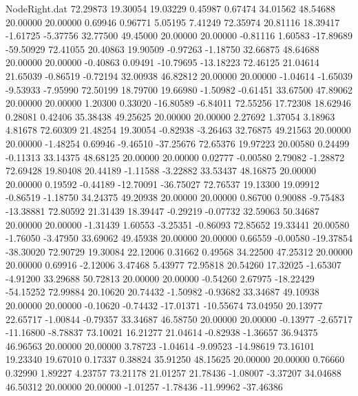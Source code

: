 \begin{filecontents}{NodeRight.dat}
  72.29873   19.30054   19.03229     0.45987    0.67474   34.01562   48.54688   20.00000   20.00000    0.69946    0.96771    5.05195    7.41249
  72.35974   20.81116   18.39417    -1.61725   -5.37756   32.77500   49.45000   20.00000   20.00000   -0.81116    1.60583  -17.89689  -59.50929
  72.41055   20.40863   19.90509    -0.97263   -1.18750   32.66875   48.64688   20.00000   20.00000   -0.40863    0.09491  -10.79695  -13.18223
  72.46125   21.04614   21.65039    -0.86519   -0.72194   32.00938   46.82812   20.00000   20.00000   -1.04614   -1.65039   -9.53933   -7.95990
  72.50199   18.79700   19.66980    -1.50982   -0.61451   33.67500   47.89062   20.00000   20.00000    1.20300    0.33020  -16.80589   -6.84011
  72.55256   17.72308   18.62946     0.28081    0.42406   35.38438   49.25625   20.00000   20.00000    2.27692    1.37054    3.18963    4.81678
  72.60309   21.48254   19.30054    -0.82938   -3.26463   32.76875   49.21563   20.00000   20.00000   -1.48254    0.69946   -9.46510  -37.25676
  72.65376   19.97223   20.00580     0.24499   -0.11313   33.14375   48.68125   20.00000   20.00000    0.02777   -0.00580    2.79082   -1.28872
  72.69428   19.80408   20.44189    -1.11588   -3.22882   33.53437   48.16875   20.00000   20.00000    0.19592   -0.44189  -12.70091  -36.75027
  72.76537   19.13300   19.09912    -0.86519   -1.18750   34.24375   49.20938   20.00000   20.00000    0.86700    0.90088   -9.75483  -13.38881
  72.80592   21.31439   18.39447    -0.29219   -0.07732   32.59063   50.34687   20.00000   20.00000   -1.31439    1.60553   -3.25351   -0.86093
  72.85652   19.33441   20.00580    -1.76050   -3.47950   33.69062   49.45938   20.00000   20.00000    0.66559   -0.00580  -19.37854  -38.30020
  72.90729   19.30084   22.12006     0.31662    0.49568   34.22500   47.25312   20.00000   20.00000    0.69916   -2.12006    3.47468    5.43977
  72.95818   20.54260   17.32025    -1.65307   -4.91200   33.29688   50.72813   20.00000   20.00000   -0.54260    2.67975  -18.22429  -54.15252
  72.99884   20.10620   20.74432    -1.50982   -0.93682   33.34687   49.10938   20.00000   20.00000   -0.10620   -0.74432  -17.01371  -10.55674
  73.04950   20.13977   22.65717    -1.00844   -0.79357   33.34687   46.58750   20.00000   20.00000   -0.13977   -2.65717  -11.16800   -8.78837
  73.10021   16.21277   21.04614    -0.82938   -1.36657   36.94375   46.96563   20.00000   20.00000    3.78723   -1.04614   -9.09523  -14.98619
  73.16101   19.23340   19.67010     0.17337    0.38824   35.91250   48.15625   20.00000   20.00000    0.76660    0.32990    1.89227    4.23757
  73.21178   21.01257   21.78436    -1.08007   -3.37207   34.04688   46.50312   20.00000   20.00000   -1.01257   -1.78436  -11.99962  -37.46386

\end{filecontents}
